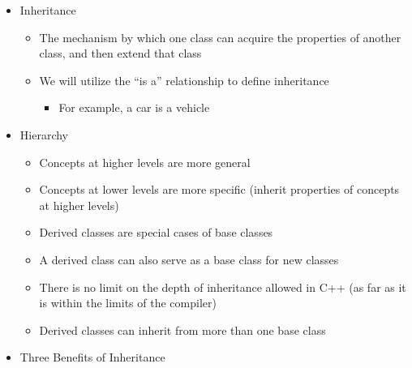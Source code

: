 \begin{itemize}

  \item Inheritance

    \begin{itemize}

      \item The mechanism by which one class can acquire the properties of another class, and then extend that class

      \item We will utilize the ``is a'' relationship to define inheritance

        \begin{itemize}
            
          \item For example, a car is a vehicle

        \end{itemize}

    \end{itemize}

  \item Hierarchy

    \begin{itemize}

      \item Concepts at higher levels are more general

      \item Concepts at lower levels are more specific (inherit properties of concepts at higher levels)

      \item Derived classes are special cases of base classes

      \item A derived class can also serve as a base class for new classes

      \item There is no limit on the depth of inheritance allowed in C++ (as far as it is within the limits of the compiler)

      \item Derived classes can inherit from more than one base class

    \end{itemize}

  \item Three Benefits of Inheritance

    \begin{enumerate}


\end{enumerate}
\end{itemize}
